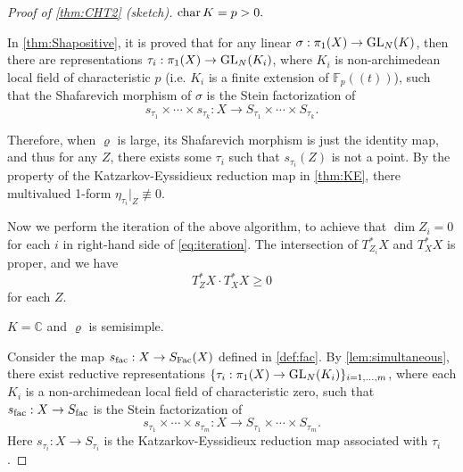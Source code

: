 \documentclass[english]{amsproc}
\theoremstyle{plain}
\newtheorem{claim}[thm]{Claim}
\theoremstyle{definition}
\theoremstyle{remark}
\theoremstyle{plain}
\numberwithin{equation}{thm} %
\newcommand{\bC}{\mathbb{C}}
\newcommand{\bF}{\mathbb{F}}
\newcommand{\GL}{{\rm GL}}
\begin{document}
	
	\begin{proof}[Proof of \cref{thm:CHT2} (sketch)]
		  ${\rm char}\, K=p>0. $
		
		In \cref{thm:Shapositive},  it is proved  that  for any linear $\sigma:\pi_1(X)\to \GL_N(K)$, then there are representations $\tau_i:\pi_1(X)\to \GL_N(K_i)$,  where $K_i$ is non-archimedean local field of characteristic $p$ (i.e. $K_i$ is a   finite extension of $\bF_{p}((t))$), such that the Shafarevich morphism of $\sigma$ is the Stein factorization of $$s_{\tau_1}\times\cdots\times s_{\tau_k}:X\to S_{\tau_1}\times\cdots\times S_{\tau_k}.$$ 
		
		Therefore, when $\varrho$ is large, its Shafarevich morphism is just the identity map, and thus for any $Z$, there exists some $\tau_i$ such that 
		$
		s_{\tau_i}(Z)
		$ is not a point. By the property of the Katzarkov-Eyssidieux reduction map in \cref{thm:KE}, there multivalued 1-form $\eta_{\tau_i}|_{Z}\not\equiv 0$. 
		
		Now we perform the iteration of the above algorithm, to achieve that $\dim Z_i=0$ for each $i$ in right-hand side of \eqref{eq:iteration}. The intersection of $T_{Z_i}^*X$ and $T_X^*X$ is proper, and we have 
		$$
		T_Z^*X\cdot T_X^*X\geq 0
		$$
		for each $Z$. 
		
		\medspace
		
		  $K=\bC $  and $\varrho$ is semisimple. 
		
	Consider the map $s_{\rm fac}:X\to S_{\rm Fac}(X)$ defined in \cref{def:fac}. 		By \cref{lem:simultaneous}, there exist  reductive representations $\{\tau_i:\pi_1(X)\to \GL_{N}(K_i)\}_{i=1,\ldots,m}$, where each  $K_i$ is a non-archimedean local field of characteristic zero,  such that $s_{\rm fac}:X\to S_{\rm fac}$ is the Stein factorization of 
			$$
			s_{\tau_1}\times \cdots \times s_{\tau_m}:X\to 	S_{\tau_1}\times \cdots \times S_{\tau_m}.
			$$
		Here $s_{\tau_i}:X\to S_{\tau_i}$ is the Katzarkov-Eyssidieux reduction map associated with $\tau_i$.  
		

\end{proof}
\end{document}
